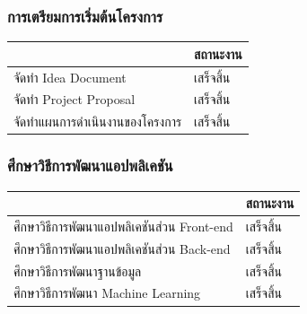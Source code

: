 \documentclass[14pt,oneside,openright,a4paper]{cpe-thai-project}
\begin{document}
  \subsubsection{การเตรียมการเริ่มต้นโครงการ}
    \begin{table}[!h]\centering
      \begin{tabular}{|l|l|}
      \hline
      \rowcolor[HTML]{9FC5E8} 
      \multicolumn{1}{|c|}{\cellcolor[HTML]{9FC5E8}ภาระงาน} & \multicolumn{1}{c|}{\cellcolor[HTML]{9FC5E8}สถานะงาน} \\ \hline
      จัดทำ Idea Document                                 & \cellcolor[HTML]{34FF34}เสร็จสิ้น                        \\ \hline
      จัดทำ Project Proposal                              & \cellcolor[HTML]{34FF34}เสร็จสิ้น                        \\ \hline
      จัดทำแผนการดำเนินงานของโครงการ                      & \cellcolor[HTML]{34FF34}เสร็จสิ้น                        \\ \hline
      \end{tabular}
      \end{table}

  \subsubsection{ศึกษาวิธีการพัฒนาแอปพลิเคชัน}
    \begin{table}[!h]\centering
      \begin{tabular}{|l|l|}
      \hline
      \rowcolor[HTML]{9FC5E8} 
      \multicolumn{1}{|c|}{\cellcolor[HTML]{9FC5E8}ภาระงาน} & \multicolumn{1}{c|}{\cellcolor[HTML]{9FC5E8}สถานะงาน} \\ \hline
      ศึกษาวิธีการพัฒนาแอปพลิเคชันส่วน Front-end          & \cellcolor[HTML]{34FF34}เสร็จสิ้น                        \\ \hline
      ศึกษาวิธีการพัฒนาแอปพลิเคชันส่วน Back-end              & \cellcolor[HTML]{34FF34}เสร็จสิ้น                        \\ \hline
      ศึกษาวิธีการพัฒนาฐานข้อมูล                          & \cellcolor[HTML]{34FF34}เสร็จสิ้น                        \\ \hline
      ศึกษาวิธีการพัฒนา Machine Learning                  & \cellcolor[HTML]{34FF34}เสร็จสิ้น                        \\ \hline
      \end{tabular}
      \end{table}
\end{document}

